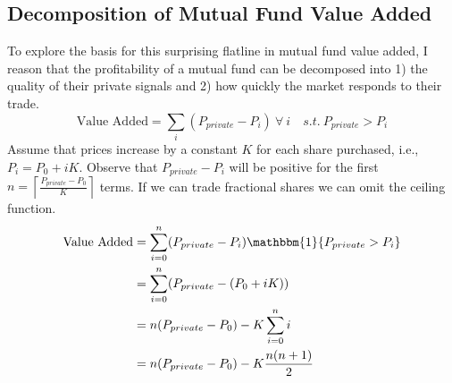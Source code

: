 \documentclass[12pt]{article}
\begin{document}
\subsection{Decomposition of Mutual Fund Value Added} \label{subsec:decomposition}
To explore the basis for this surprising flatline in mutual fund value added,
I reason that the profitability of a mutual fund can be decomposed into 1) the quality of their private signals and 2) how quickly the market responds to their trade.
\begin{equation}
    \text{Value Added} = \sum_i (P_{private} - P_{i}) \ \forall \ i \quad s.t. \ P_{private} > P_i
\end{equation}
Assume that prices increase by a constant $K$ for each share purchased, i.e., $P_i = P_0 + iK$. Observe that $P_{private} - P_i$ will be positive for the first $n=\left\lceil \frac{P_{private} - P_0}{K}\right\rceil$ terms. If we can trade fractional shares we can omit the ceiling function.
\begin{align*}
    \text{Value Added} &= \sum_{i=0}^{n} (P_{private} - P_{i})\mathbbm{1}\{P_{private} > P_i\} \\
    &= \sum_{i=0}^{n} (P_{private} - (P_0 + iK)) \\
    &= n(P_{private} - P_0) - K\sum_{i=0}^n i \\
    &= n(P_{private} - P_0) - K\frac{n(n+1)}{2}
\end{align*}
\end{document}
